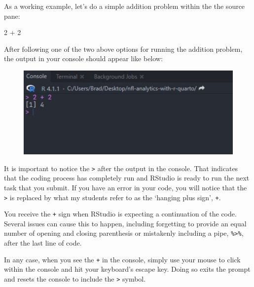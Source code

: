 \documentclass[
  letterpaper,
]{krantz}
\newenvironment{Shaded}{\begin{snugshade}}{\end{snugshade}}
\newcommand{\DecValTok}[1]{\textcolor[rgb]{0.68,0.00,0.00}{#1}}
\newcommand{\SpecialCharTok}[1]{\textcolor[rgb]{0.37,0.37,0.37}{#1}}
\begin{document}
As a working example, let's do a simple addition problem within the the
source pane:

\begin{Shaded}
\begin{Highlighting}[]
\DecValTok{2} \SpecialCharTok{+} \DecValTok{2}
\end{Highlighting}
\end{Shaded}

After following one of the two above options for running the addition
problem, the output in your console should appear like below:

\begin{figure}

{\centering \includegraphics{images/example_console_output.jpg}

}

\end{figure}

\begin{tcolorbox}[enhanced jigsaw, left=2mm, toprule=.15mm, opacitybacktitle=0.6, leftrule=.75mm, bottomrule=.15mm, colbacktitle=quarto-callout-tip-color!10!white, breakable, colback=white, bottomtitle=1mm, toptitle=1mm, title=\textcolor{quarto-callout-tip-color}{\faLightbulb}\hspace{0.5em}{Tip}, coltitle=black, titlerule=0mm, arc=.35mm, opacityback=0, colframe=quarto-callout-tip-color-frame, rightrule=.15mm]

It is important to notice the \texttt{\textgreater{}} after the output
in the console. That indicates that the coding process has completely
run and RStudio is ready to run the next task that you submit. If you
have an error in your code, you will notice that the
\texttt{\textgreater{}} is replaced by what my students refer to as the
`hanging plus sign', \texttt{+}.

You receive the \texttt{+} sign when RStudio is expecting a continuation
of the code. Several issues can cause this to happen, including
forgetting to provide an equal number of opening and closing parenthesis
or mistakenly including a pipe, \texttt{\%\textgreater{}\%}, after the
last line of code.

In any case, when you see the \texttt{+} in the console, simply use your
mouse to click within the console and hit your keyboard's escape key.
Doing so exits the prompt and resets the console to include the
\texttt{\textgreater{}} symbol.

\end{tcolorbox}
\end{document}
